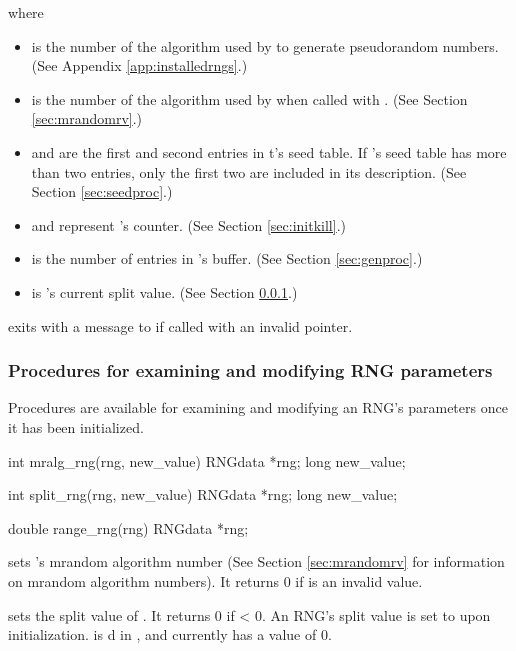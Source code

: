 where

\begin{itemize}
\item {} is the number of the algorithm used by  to generate
pseudorandom numbers.  (See Appendix \ref{app:installedrngs}.)
\item {} is the number of the algorithm used by
 when called with .  (See Section
\ref{sec:mrandomrv}.)
\item {} and  are the first and second entries in
t's seed table.  If 's seed table has more than two
entries, only the first two are included in its description.  (See
Section \ref{sec:seedproc}.)
\item {} and  represent 's counter.
(See Section \ref{sec:initkill}.)
\item {} is the number of entries in 's buffer.
(See Section \ref{sec:genproc}.)
\item {} is 's current split value.  (See Section
\ref{sec:examandmodify}.)
\end{itemize}

 exits with a message to  if called
with an invalid  pointer.

\subsubsection{Procedures for examining and modifying RNG parameters}
\label{sec:examandmodify}

Procedures are available for examining and modifying an RNG's parameters
once it has been initialized.\\

\begin{example}
	int mralg_rng(rng, new_value)
	RNGdata *rng;
	long new_value;

	int split_rng(rng, new_value)
	RNGdata *rng;
	long new_value;

	double range_rng(rng)
	RNGdata *rng;\\
\end{example}

 sets 's mrandom algorithm number (See Section
\ref{sec:mrandomrv} for information on mrandom algorithm numbers).  It
returns 0 if  is an invalid value.

 sets the split value of .  It returns 0 if
 < 0.  An RNG's split value is set to 
upon initialization.   is d in
, and currently has a value of 0.

